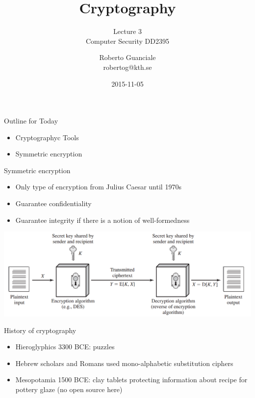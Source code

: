 \documentclass{beamer}
\title{Cryptography}
\subtitle{Lecture 3 \\ Computer Security DD2395}
\author[R. Guanciale]{
  Roberto Guanciale\\
  robertog@kth.se
}
\date{2015-11-05}
\begin{document}
\begin{frame}[plain]
  \titlepage
\end{frame}

\begin{frame}{Outline for Today}
  \begin{itemize}
    \item Cryptographyc Tools
    \item Symmetric encryption
  \end{itemize}
\end{frame}

\begin{frame}{Symmetric encryption}
  \begin{itemize}
  \item Only type of encryption from Julius Caesar until 1970s
  \item Guarantee confidentiality
  \item Guarantee integrity if there is a notion of well-formedness
  \end{itemize}
  \begin{center}
    \includegraphics[width=0.9\linewidth]{symm}
  \end{center}
\end{frame}

\begin{frame}{History of cryptography}
  \begin{itemize}
  \item Hieroglyphics 3300 BCE: puzzles
  \item Hebrew scholars and Romans used mono-alphabetic substitution ciphers
  \item Mesopotamia 1500 BCE: clay tablets protecting information about
    recipe for pottery glaze (no open source here)
  \end{itemize}
  
\end{frame}
\end{document}
